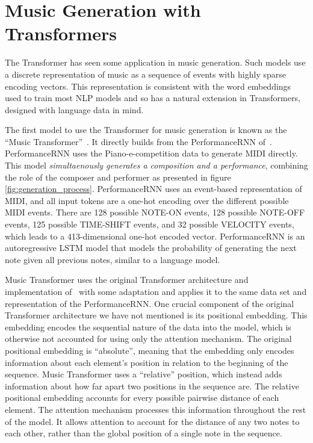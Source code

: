 \section{Music Generation with Transformers}
The Transformer has seen some application in music generation. Such models use a discrete representation of music as a sequence of events with highly sparse encoding vectors. This representation is consistent with the word embeddings used to train most NLP models and so has a natural extension in Transformers, designed with language data in mind. 

The first model to use the Transformer for music generation is known as the ``Music Transformer''~\cite{huang2018music}. It directly builds from the PerformanceRNN of~\citet{oore2020time}. PerformanceRNN uses the Piano-e-competition data to generate MIDI directly. This model \emph{simultaenously generates a composition and a performance}, combining the role of the composer and performer as presented in figure \ref{fig:generation_process}. PerformanceRNN uses an event-based representation of MIDI, and all input tokens are a one-hot encoding over the different possible MIDI events. There are 128 possible NOTE-ON events, 128 possible NOTE-OFF events, 125 possible TIME-SHIFT events, and 32 possible VELOCITY events, which leads to a 413-dimensional one-hot encoded vector. PerformanceRNN is an autoregressive LSTM model that models the probability of generating the next note given all previous notes, similar to a language model. 

Music Transformer uses the original Transformer architecture and implementation of~\citet{vaswani2017attention} with some adaptation and applies it to the same data set and representation of the PerformanceRNN. One crucial component of the original Transformer architecture we have not mentioned is its positional embedding. This embedding encodes the sequential nature of the data into the model, which is otherwise not accounted for using only the attention mechanism. The original positional embedding is ``absolute'', meaning that the embedding only encodes information about each element's position in relation to the beginning of the sequence. Music Transformer uses a ``relative'' position, which instead adds information about how far apart two positions in the sequence are. The relative positional embedding accounts for every possible pairwise distance of each element. The attention mechanism processes this information throughout the rest of the model. It allows attention to account for the distance of any two notes to each other, rather than the global position of a single note in the sequence. 


